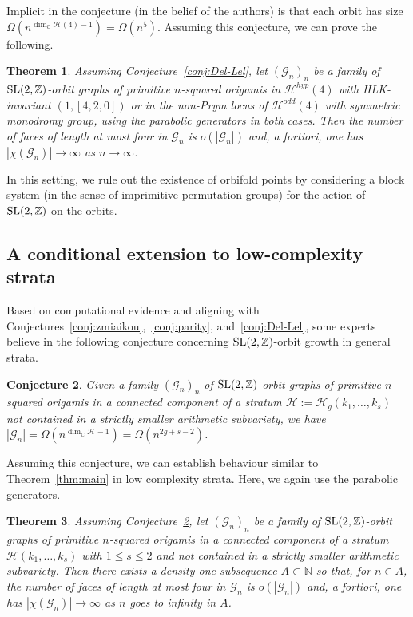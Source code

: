 \documentclass[a4paper,11pt]{amsart}
\numberwithin{equation}{section}
\numberwithin{figure}{section}
\numberwithin{table}{section}
\newtheorem{theorem}{Theorem}[section]
\newtheorem{conjecture}[theorem]{Conjecture}
\newcommand{\calH}{\mathcal{H}}
\newcommand{\odd}{\mathcal{H}^{odd}}
\newcommand{\hyp}{\mathcal{H}^{hyp}}
\newcommand{\C}{\mathbb{C}}
\newcommand{\Z}{\mathbb{Z}}
\newcommand{\N}{\mathbb{N}}
\DeclareMathOperator{\SL}{{\rm{SL}}}
\begin{document}
Implicit in the conjecture (in the belief of the authors) is that each orbit has size $\Omega(n^{\dim_\C\calH(4) - 1}) = \Omega(n^5)$. Assuming this conjecture, we can prove the following.

\begin{theorem}\label{thm:submain-4}
    Assuming Conjecture~\ref{conj:Del-Lel}, let $(\mathcal{G}_{n})_{n}$ be a family of $\SL(2,\Z)$-orbit graphs of primitive $n$-squared origamis in $\hyp(4)$ with HLK-invariant $(1,[4,2,0])$ or in the non-Prym locus of $\odd(4)$ with symmetric monodromy group, using the parabolic generators in both cases. Then the number of faces of length at most four in $\mathcal{G}_{n}$ is $o(|\mathcal{G}_{n}|)$ and, \emph{a fortiori}, one has $|\chi(\mathcal{G}_{n})|\to\infty$ as $n\to\infty$.
\end{theorem}

In this setting, we rule out the existence of orbifold points by considering a block system (in the sense of imprimitive permutation groups) for the action of $\SL(2,\Z)$ on the orbits.


\subsection{A conditional extension to low-complexity strata}

Based on computational evidence and aligning with Conjectures~\ref{conj:zmiaikou},~\ref{conj:parity}, and~\ref{conj:Del-Lel}, some experts believe in the following conjecture concerning $\SL(2,\Z)$-orbit growth in general strata.

\begin{conjecture}\label{conj:wild}
    Given a family $(\mathcal{G}_{n})_{n}$ of $\SL(2,\Z)$-orbit graphs of primitive $n$-squared origamis in a connected component of a stratum $\mathcal{H}:=\calH_{g}(k_{1},\dots,k_{s})$ not contained in a strictly smaller arithmetic subvariety, we have $|\mathcal{G}_{n}| = \Omega(n^{\dim_{\C}\mathcal{H}-1}) = \Omega(n^{2g+s-2})$.
\end{conjecture}

Assuming this conjecture, we can establish behaviour similar to Theorem~\ref{thm:main} in low complexity strata. Here, we again use the parabolic generators.

\begin{theorem}\label{thm:general}
    Assuming Conjecture~\ref{conj:wild}, let $(\mathcal{G}_{n})_{n}$ be a family of $\SL(2,\Z)$-orbit graphs of primitive $n$-squared origamis in a connected component of a stratum $\calH(k_{1},\ldots,k_s)$ with $1\leq s\leq 2$ and not contained in a strictly smaller arithmetic subvariety. Then there exists a density one subsequence $A\subset\N$ so that, for $n\in A$, the number of faces of length at most four in $\mathcal{G}_{n}$ is $o(|\mathcal{G}_{n}|)$ and, \emph{a fortiori}, one has $|\chi(\mathcal{G}_{n})|\to\infty$ as $n$ goes to infinity in $A$.
\end{theorem}
\end{document}
